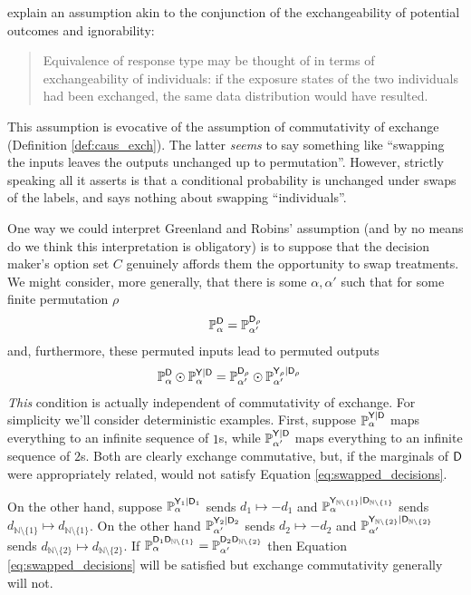 \citet{greenland_identifiability_1986} explain an assumption akin to the conjunction of the exchangeability of potential outcomes and ignorability:
\begin{quote}
    Equivalence of response type may be thought of in terms of exchangeability of individuals: if the exposure states of the two individuals had been exchanged, the same data distribution would have resulted.
\end{quote}
This assumption is evocative of the assumption of commutativity of exchange (Definition \ref{def:caus_exch}). The latter \emph{seems} to say something like ``swapping the inputs leaves the outputs unchanged up to permutation''. However, strictly speaking all it asserts is that a conditional probability is unchanged under swaps of the labels, and says nothing about swapping ``individuals''.

One way we could interpret Greenland and Robins' assumption (and by no means do we think this interpretation is obligatory) is to suppose that the decision maker's option set $C$ genuinely affords them the opportunity to swap treatments. We might consider, more generally, that there is some $\alpha,\alpha'$ such that for some finite permutation $\rho$
\begin{align}
    \mathbb{P}_\alpha^{\mathsf{D}} = \mathbb{P}_{\alpha'}^{\mathsf{D}_\rho}
\end{align}
and, furthermore, these permuted inputs lead to permuted outputs
\begin{align}
    \mathbb{P}_\alpha^{\mathsf{D}}\odot \mathbb{P}_\alpha^{\mathsf{Y}|\mathsf{D}} &= \mathbb{P}_{\alpha'}^{\mathsf{D}_\rho}\odot \mathbb{P}_{\alpha'}^{\mathsf{Y}_\rho|\mathsf{D}_\rho}\label{eq:swapped_decisions}
\end{align}
\emph{This} condition is actually independent of commutativity of exchange. For simplicity we'll consider deterministic examples. First, suppose $\mathbb{P}_\alpha^{\mathsf{Y}|\mathsf{D}}$ maps everything to an infinite sequence of $1$s, while $\mathbb{P}_{\alpha'}^{\mathsf{Y}|\mathsf{D}}$ maps everything to an infinite sequence of $2$s. Both are clearly exchange commutative, but, if the marginals of $\mathsf{D}$ were appropriately related, would not satisfy Equation \eqref{eq:swapped_decisions}.

On the other hand, suppose $\mathbb{P}_\alpha^{\mathsf{Y}_1|\mathsf{D}_1}$ sends $d_1\mapsto -d_1$ and $\mathbb{P}_\alpha^{\mathsf{Y}_{\mathbb{N}\setminus\{1\}}|\mathsf{D}_{\mathbb{N}\setminus\{1\}}}$ sends $d_{\mathbb{N}\setminus\{1\}} \mapsto d_{\mathbb{N}\setminus\{1\}}$. On the other hand $\mathbb{P}_{\alpha'}^{\mathsf{Y}_2|\mathsf{D}_2}$ sends $d_2\mapsto -d_2$ and $\mathbb{P}_{\alpha'}^{\mathsf{Y}_{\mathbb{N}\setminus\{2\}}|\mathsf{D}_{\mathbb{N}\setminus\{2\}}}$ sends $d_{\mathbb{N}\setminus\{2\}} \mapsto d_{\mathbb{N}\setminus\{2\}}$. If $\mathbb{P}_\alpha^{\mathsf{D}_1\mathsf{D}_{\mathbb{N}\setminus\{1\}}}=\mathbb{P}_{\alpha'}^{\mathsf{D}_2\mathsf{D}_{\mathbb{N}\setminus\{2\}}}$ then Equation \eqref{eq:swapped_decisions} will be satisfied but exchange commutativity generally will not.

